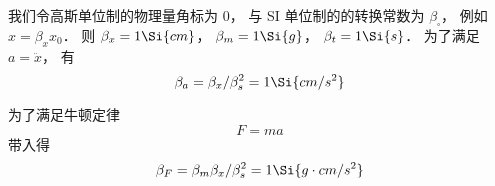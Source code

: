 
我们令高斯单位制的物理量角标为 0， 与 SI 单位制的的转换常数为 $\beta_\square$， 例如 $x = \beta_x x_0$． 则 $\beta_x = 1\Si{cm}$， $\beta_m = 1\Si{g}$， $\beta_t = 1\Si{s}$．
为了满足 $a = \ddot x$， 有
\begin{equation}
\beta_a = \beta_x/\beta_s^2 = 1\Si{cm/s^2}
\end{equation}

为了满足牛顿定律
\begin{equation}
F = ma
\end{equation}
带入得
\begin{equation}
\beta_F = \beta_m \beta_x/\beta_s^2 = 1\Si{g \cdot cm/s^2}
\end{equation}
